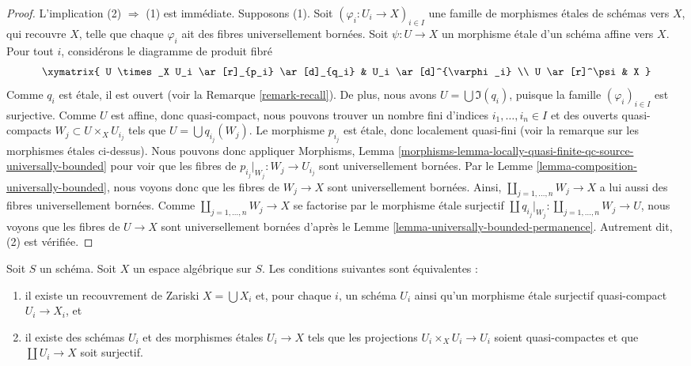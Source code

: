 \begin{proof}
L'implication (2) $\Rightarrow$ (1) est immédiate.
Supposons (1). Soit $(\varphi_i : U_i \to X)_{i \in I}$ une famille de
morphismes étales de schémas vers $X$, qui recouvre $X$, telle que
chaque $\varphi_i$ ait des fibres universellement bornées.
Soit $\psi : U \to X$ un morphisme étale d'un schéma affine vers $X$.
Pour tout $i$, considérons le diagramme de produit fibré
$$
\xymatrix{
U \times_X U_i \ar[r]_{p_i} \ar[d]_{q_i} & U_i \ar[d]^{\varphi_i} \\
U \ar[r]^\psi & X
}
$$
Comme $q_i$ est étale, il est ouvert (voir la Remarque \ref{remark-recall}).
De plus, nous avons $U = \bigcup \Im(q_i)$, puisque la famille
$(\varphi_i)_{i \in I}$ est surjective. Comme $U$ est affine, donc
quasi-compact, nous pouvons trouver un nombre fini d'indices
$i_1, \ldots, i_n \in I$ et des ouverts quasi-compacts
$W_j \subset U \times_X U_{i_j}$ tels que
$U = \bigcup q_{i_j}(W_j)$.
Le morphisme $p_{i_j}$ est étale, donc localement quasi-fini
(voir la remarque sur les morphismes étales ci-dessus). Nous pouvons donc
appliquer Morphisms, Lemma
\ref{morphisms-lemma-locally-quasi-finite-qc-source-universally-bounded}
pour voir que les fibres de $p_{i_j}|_{W_j} : W_j \to U_{i_j}$ sont
universellement bornées. Par le
Lemme \ref{lemma-composition-universally-bounded},
nous voyons donc que les fibres de $W_j \to X$ sont universellement bornées.
Ainsi, $\coprod_{j = 1, \ldots, n} W_j \to X$ a lui aussi des fibres
universellement bornées. Comme $\coprod_{j = 1, \ldots, n} W_j \to X$ se
factorise par le morphisme étale surjectif
$\coprod q_{i_j}|_{W_j} : \coprod_{j = 1, \ldots, n} W_j \to U$, nous
voyons que les fibres de $U \to X$ sont universellement bornées d'après le
Lemme \ref{lemma-universally-bounded-permanence}.
Autrement dit, (2) est vérifiée.
\end{proof}

\begin{lemma}
\label{lemma-characterize-very-reasonable}
Soit $S$ un schéma.
Soit $X$ un espace algébrique sur $S$.
Les conditions suivantes sont équivalentes :
\begin{enumerate}
\item il existe un recouvrement de Zariski $X = \bigcup X_i$ et, pour
chaque $i$, un schéma $U_i$ ainsi qu'un morphisme étale surjectif
quasi-compact $U_i \to X_i$, et
\item il existe des schémas $U_i$ et des morphismes étales $U_i \to X$
tels que les projections $U_i \times_X U_i \to U_i$ soient quasi-compactes
et que $\coprod U_i \to X$ soit surjectif.
\end{enumerate}
\end{lemma}

